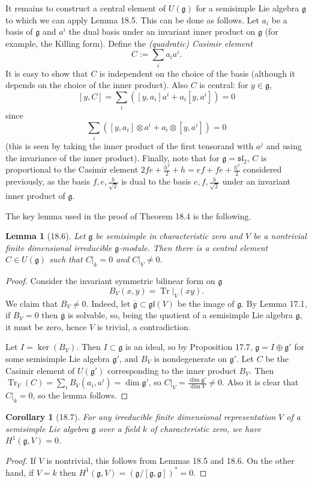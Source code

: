 \documentclass[UTF8,11pt]{ctexart}
\newtheorem*{lemma}{Lemma}
\newtheorem*{corollary}{Corollary}
\begin{document}
It remains to construct a central element of $U(\mathfrak g)$ for a semisimple Lie algebra $\mathfrak g$ to which we can apply Lemma 18.5. This can be done as follows. Let $a_i$ be a basis of $\mathfrak g$ and $a^i$ the dual basis under an invariant inner product on $\mathfrak g$ (for example, the Killing form). Define the \emph{(quadratic) Casimir element}
\[
C:=\sum_i a_i a^i.
\]
It is easy to show that $C$ is independent on the choice of the basis (although it depends on the choice of the inner product). Also $C$ is central: for $y\in\mathfrak g$,
\[
[y,C]=\sum_i([y,a_i]a^i+a_i[y,a^i])=0
\]
since
\[
\sum_i([y,a_i]\otimes a^i+a_i\otimes[y,a^i])=0
\]
(this is seen by taking the inner product of the first tensorand with $a^j$ and using the invariance of the inner product). Finally, note that for $\mathfrak g=\mathfrak{sl}_2$, $C$ is proportional to the Casimir element $2fe+\frac{h^2}{2}+h=ef+fe+\frac{h^2}{2}$ considered previously, as the basis $f,e,\frac h{\sqrt2}$ is dual to the basis $e,f,\frac h{\sqrt2}$ under an invariant inner product of $\mathfrak g$.

The key lemma used in the proof of Theorem 18.4 is the following.
\begin{lemma}[18.6]
Let $\mathfrak g$ be semisimple in characteristic zero and $V$ be a nontrivial finite dimensional irreducible $\mathfrak g$-module. Then there is a central element $C\in U(\mathfrak g)$ such that $C|_k=0$ and $C|_V\ne0$.
\end{lemma}
\begin{proof}
Consider the invariant symmetric bilinear form on $\mathfrak g$
\[
B_V(x,y)=\operatorname{Tr}|_V(xy).
\]
We claim that $B_V\ne0$. Indeed, let $\overline{\mathfrak g}\subset\mathfrak{gl}(V)$ be the image of $\mathfrak g$. By Lemma 17.1, if $B_V=0$ then $\overline{\mathfrak g}$ is solvable, so, being the quotient of a semisimple Lie algebra $\mathfrak g$, it must be zero, hence $V$ is trivial, a contradiction.

Let $I=\ker(B_V)$. Then $I\subset\mathfrak g$ is an ideal, so by Proposition 17.7, $\mathfrak g=I\oplus\mathfrak g'$ for some semisimple Lie algebra $\mathfrak g'$, and $B_V$ is nondegenerate on $\mathfrak g'$. Let $C$ be the Casimir element of $U(\mathfrak g')$ corresponding to the inner product $B_V$. Then $\operatorname{Tr}_V(C)=\sum_i B_V(a_i,a^i)=\dim\mathfrak g'$, so $C|_V=\frac{\dim\mathfrak g'}{\dim V}\ne0$. Also it is clear that $C|_k=0$, so the lemma follows.
\end{proof}

\begin{corollary}[18.7]
For any irreducible finite dimensional representation $V$ of a semisimple Lie algebra $\mathfrak g$ over a field $k$ of characteristic zero, we have $H^1(\mathfrak g,V)=0$.
\end{corollary}
\begin{proof}
If $V$ is nontrivial, this follows from Lemmas 18.5 and 18.6. On the other hand, if $V=k$ then $H^1(\mathfrak g,V)=(\mathfrak g/[\mathfrak g,\mathfrak g])^*=0$.
\end{proof}
\end{document}
